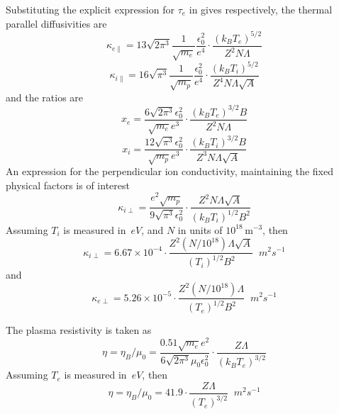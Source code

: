 Substituting the explicit expression for $\tau_e$ in  gives
respectively, the thermal parallel diffusivities are
\begin{equation}\label{eq:kappae}
\kappa_{e\|}= 13 \sqrt{2\pi^3} \frac{1}{\sqrt{m_e}}\frac{\epsilon_0^2}{e^4} \cdot
\frac{(k_BT_e)^{5/2}}{Z^2 N\Lambda}
\end{equation}
\begin{equation}\label{eq:kappai}
\kappa_{i\|}= 16 \sqrt{\pi^3} \frac{1}{\sqrt{m_p}}\frac{\epsilon_0^2}{e^4} \cdot
\frac{(k_BT_i)^{5/2}}{Z^4 N\Lambda \sqrt{A}}
\end{equation}
and the ratios are
\begin{equation}\label{eq:xee}
x_e=\frac {6 \sqrt{2\pi^3}\epsilon_0^2} {\sqrt{m_e}e^3} \cdot
\frac {(k_BT_e)^{3/2}B} {Z^2 N\Lambda}
\end{equation}
\begin{equation}\label{eq:xie}
x_i=\frac {12 \sqrt{\pi^3}\epsilon_0^2} {\sqrt{m_p}e^3} \cdot
\frac{(k_BT_i)^{3/2}B} {Z^3 N\Lambda \sqrt{A}}
\end{equation}
An expression for the perpendicular ion conductivity, maintaining
the fixed physical factors is of interest
\begin{equation}\label{eq:kperpie}
\kappa_{i\perp}=\frac{e^2\sqrt{m_p}}{9 \sqrt{\pi^3}\epsilon_0^2} \cdot
\frac{Z^2 N\Lambda \sqrt{A}}{(k_BT_i)^{1/2}B^2}
\end{equation}
Assuming $T_i$ is measured in~$eV$, and $N$ in units of $10^{18}$\,m$^{-3}$, then
\begin{equation}\label{eq:kperpin}
\kappa_{i\perp}=6.67 \times 10^{-4} \cdot
\frac{Z^2 (N/10^{18}) \Lambda \sqrt{A}}{(T_i)^{1/2}B^2}\;\;m^2 s^{-1}
\end{equation}
and
\begin{equation}\label{eq:kperpen}
\kappa_{e\perp}=5.26 \times 10^{-5} \cdot
\frac{Z^2 (N/10^{18}) \Lambda}{(T_e)^{1/2}B^2}\;\;m^2 s^{-1}
\end{equation}

The plasma resistivity is taken as
\begin{equation}\label{eq:resis}
\eta=\eta_B/\mu_0 =\frac{0.51\sqrt{m_e}e^2}{6 \sqrt{2\pi^3}\mu_0\epsilon_0^2} \cdot
\frac{Z \Lambda}{(k_BT_e)^{3/2}}
\end{equation}
Assuming $T_e$ is measured in~$eV$, then
\begin{equation}\label{eq:resisn}
\eta=\eta_B/\mu_0 =41.9\cdot\frac{Z \Lambda}{(T_e)^{3/2}}\;\;m^2 s^{-1}
\end{equation}


